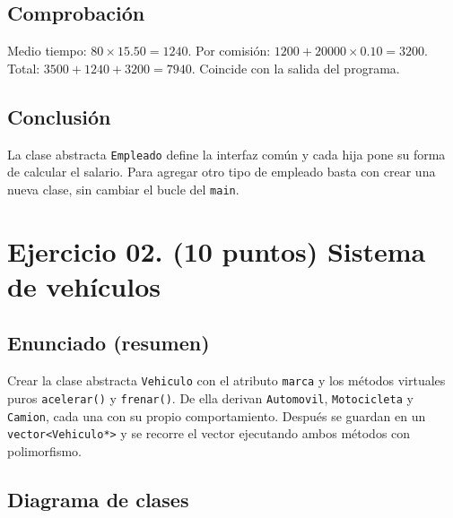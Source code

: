 \documentclass[12pt]{article}
\begin{document}
\subsection*{Comprobación}
Medio tiempo: $80 \times 15.50 = 1240$. Por comisión: $1200 + 20000 \times 0.10 = 3200$. Total: $3500 + 1240 + 3200 = 7940$. Coincide con la salida del programa.

\subsection*{Conclusión}
La clase abstracta \texttt{Empleado} define la interfaz común y cada hija pone su forma de calcular el salario. Para agregar otro tipo de empleado basta con crear una nueva clase, sin cambiar el bucle del \texttt{main}.

\newpage
\section{Ejercicio 02. (10 puntos) Sistema de vehículos}

\subsection*{Enunciado (resumen)}
Crear la clase abstracta \texttt{Vehiculo} con el atributo \texttt{marca} y los métodos virtuales puros \texttt{acelerar()} y \texttt{frenar()}. De ella derivan \texttt{Automovil}, \texttt{Motocicleta} y \texttt{Camion}, cada una con su propio comportamiento. Después se guardan en un \texttt{vector<Vehiculo*>} y se recorre el vector ejecutando ambos métodos con polimorfismo.

\subsection*{Diagrama de clases}
\end{document}
